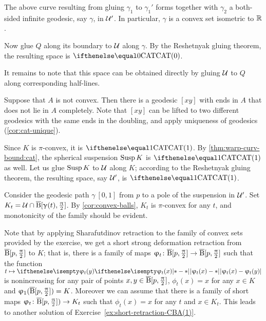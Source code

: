 The above curve resulting from gluing  
$\gamma_1$ to $\gamma_1'$ 
forms together with $ \gamma_2$ 
a both-sided infinite geodesic, say $\gamma$, in $\mathcal{U}'$.
In particular, $\gamma$ is a convex set isometric to $\mathbb{R}$.

Now glue 
$Q$ along its boundary to $\mathcal{U}$ along $\gamma$.
By the Reshetnyak gluing theorem, the resulting space is $\CAT0$.

It remains to note that this space can be obtained directly by gluing $\mathcal{U}$ to $Q$ along 
corresponding half-lines.

Suppose that $A$ is not convex.
Then there is a geodesic $[xy]$ with ends in $A$ that does not lie in $A$ completely.
Note that $[xy]$ can be lifted to two different geodesics with the same ends  in the doubling, and apply uniqueness of geodesics (\ref{cor:cat-unique}).

Since $K$ is $\pi$-convex, it is $\CAT1$.
By \ref{thm:warp-curv-bound:cat}, the spherical suspension $\mathop{\rm Susp}\nolimits K$ is $\CAT1$ as well.
Let us glue $\mathop{\rm Susp}\nolimits K$ to $\mathcal{U}$  along $K$;
according to the Reshetnyak gluing theorem, the resulting space, say $\mathcal{U}'$, is $\CAT1$.

Consider the geodesic path $\gamma\:[0,1]$ from $p$ to a pole of the suspension in $\mathcal{U}'$.
Set $K_t=\spc{U}\cap\cBall[\gamma(t),\tfrac\pi2]$.
By \ref{cor:convex-balls}, $K_t$ is $\pi$-convex for any $t$,  and monotonicity of the family should be evident.

Note that by applying Sharafutdinov retraction to the family of convex sets provided by the exercise,
we get a short strong deformation retraction from $\overline{\mathrm{B}}{}[p,\tfrac{\uppi}2]$ to $K$;
that is, there is a family of maps $\phi_t\:\cBall[p,\tfrac\pi2]\to \cBall[p,\tfrac\pi2]$ such that 
the function $t\mapsto \dist{\phi_t(x)}{\phi_t(y)}{}$ is nonincreasing for any pair of points $x,y\in\cBall[p,\tfrac\pi2]$, $\phi_t(x)=x$ for any $x\in K$ and $\upvarphi_1(\overline{\mathrm{B}}{}[p,\tfrac{\uppi}2])=K$. 
Moreover we can assume that there is a family of short maps 
$\phi_t\:\cBall[p,\tfrac\pi2])\to  K_t$ such that $\phi_t(x)=x$ for any $t$ and $x\in K_t$.
This leads to another solution of Exercise~\ref{ex:short-retraction-CBA(1)}.

